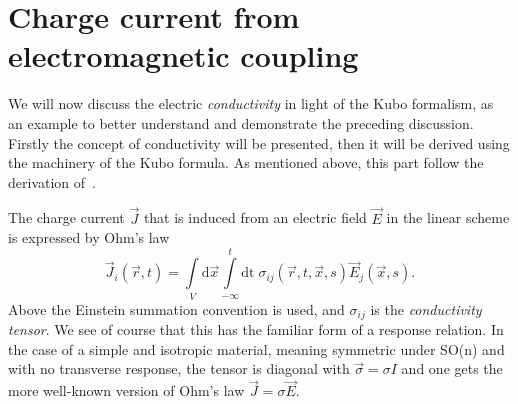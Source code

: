 \section{Charge current from electromagnetic coupling}
We will now discuss the electric \emph{conductivity} in light of the Kubo formalism, as an example to better understand and demonstrate the preceding discussion.
Firstly the concept of conductivity will be presented, then it will be derived using the machinery of the Kubo formula.
As mentioned above, this part follow the derivation of~\textcite{mahanManyparticlePhysics2000}.

The charge current $\vec{J}$ that is induced from an electric field $\vec{E}$ in the linear scheme is expressed by Ohm's law
\begin{equation}
  \label{eq:ohm}
  \vec{J}_i(\vec{r}, t) =
  \int\limits_{V} \mathrm{d} \vec{x} \!\int\limits_{-\infty}^t \mathrm{dt} \;
  \sigma_{ij}(\vec{r}, t, \vec{x}, s)
  \vec{E}_j(\vec{x}, s).
\end{equation}
Above the Einstein summation convention is used, and $\sigma_{ij}$ is the \emph{conductivity tensor}.
We see of course that this has the familiar form of a response relation.
In the case of a simple and isotropic material, meaning symmetric under SO(n) and with no transverse response, the tensor is diagonal with $\vec{\sigma} = \sigma I$ and one gets the more well-known version of Ohm's law $\vec{J} = \sigma \vec{E}$.


